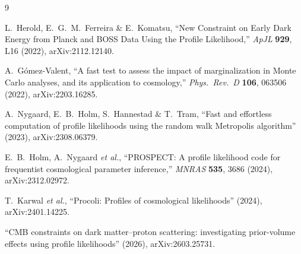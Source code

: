 \documentclass[11pt]{article}
\begin{document}
\begin{thebibliography}{9}

 L.~Herold, E.~G.~M.~Ferreira \& E.~Komatsu,
``New Constraint on Early Dark Energy from Planck and BOSS Data Using the
Profile Likelihood,'' \emph{ApJL} \textbf{929}, L16 (2022),
arXiv:2112.12140.

 A.~G\'omez-Valent,
``A fast test to assess the impact of marginalization in Monte Carlo
analyses, and its application to cosmology,'' \emph{Phys.\ Rev.\ D}
\textbf{106}, 063506 (2022), arXiv:2203.16285.

 A.~Nygaard, E.~B.~Holm, S.~Hannestad \& T.~Tram,
``Fast and effortless computation of profile likelihoods using the random
walk Metropolis algorithm'' (2023), arXiv:2308.06379.

 E.~B.~Holm, A.~Nygaard \emph{et al.},
``PROSPECT: A profile likelihood code for frequentist cosmological
parameter inference,'' \emph{MNRAS} \textbf{535}, 3686 (2024),
arXiv:2312.02972.

 T.~Karwal \emph{et al.},
``Procoli: Profiles of cosmological likelihoods'' (2024),
arXiv:2401.14225.

 ``CMB constraints on dark matter--proton scattering:
investigating prior-volume effects using profile likelihoods'' (2026),
arXiv:2603.25731.

\end{thebibliography}
\end{document}
